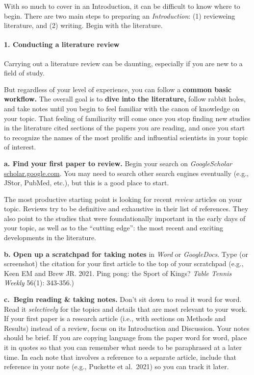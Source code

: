 \documentclass[
]{book}
\begin{document}
With so much to cover in an Introduction, it can be difficult to know where to begin. There are two main steps to preparing an \emph{Introduction}: (1) revieweing literature, and (2) writing. Begin with the literature.

\hypertarget{conducting-a-literature-review}{%
\paragraph{1. Conducting a literature review}\label{conducting-a-literature-review}}

Carrying out a literature review can be daunting, especially if you are new to a field of study.

But regardless of your level of experience, you can follow a \textbf{common basic workflow.} The overall goal is to \textbf{dive into the literature,} follow rabbit holes, and take notes until you begin to feel familiar with the canon of knowledge on your topic. That feeling of familiarity will come once you stop finding new studies in the literature cited sections of the papers you are reading, and once you start to recognize the names of the most prolific and influential scientists in your topic of interest.

\textbf{a. Find your first paper to review.} Begin your search on \emph{GoogleScholar} \url{scholar.google.com}. You may need to search other search engines eventually (e.g., JStor, PubMed, etc.), but this is a good place to start.

The most productive starting point is looking for recent \emph{review} articles on your topic. Reviews try to be definitive and exhaustive in their list of references. They also point to the studies that were foundationally important in the early days of your topic, as well as to the ``cutting edge'': the most recent and exciting developments in the literature.

\textbf{b. Open up a scratchpad for taking notes} in \emph{Word} or \emph{GoogleDocs}. Type (or screenshot) the citation for your first article to the top of your scratchpad (e.g., Keen EM and Brew JR. 2021. Ping pong: the Sport of Kings? \emph{Table Tennis Weekly} 56(1): 343-356.)

\textbf{c.~Begin reading \& taking notes.} Don't sit down to read it word for word. Read it \emph{selectively} for the topics and details that are most relevant to your work. If your first paper is a research article (i.e., with sections on Methods and Results) instead of a review, focus on its Introduction and Discussion. Your notes should be brief. If you are copying language from the paper word for word, place it in quotes so that you can remember what needs to be paraphrased at a later time. In each note that involves a reference to a separate article, include that reference in your note (e.g.,
Puckette et al.~2021) so you can track it later.
\end{document}
